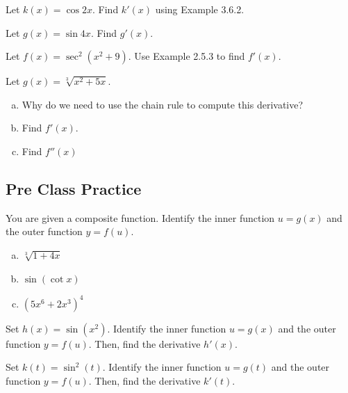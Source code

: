 \documentclass[notes]{subfiles}
\begin{document}
		\begin{ex}
			Let \(k(x) = \cos 2x\).  Find \(k'(x)\) using Example 3.6.2.
		\end{ex}
		
		\begin{ex}
			Let \(g(x) = \sin 4x\).  Find \(g'(x)\).
		\end{ex}
			\newpage
			
		\begin{ex}
			Let \(f(x) = \sec^2(x^2+9)\).  Use Example 2.5.3 to find \(f'(x)\).
		\end{ex}
			
		\begin{ex}
			Let \(g(x) = \sqrt[3]{x^2 + 5x}\).
			\begin{enumerate}[(a)]
				\item Why do we need to use the chain rule to compute this derivative?
					
				\item Find \(f'(x)\).
					
				\item Find \(f''(x)\)
			\end{enumerate}
		\end{ex}
			\newpage
			
	\subsection*{Pre Class Practice}		
		\begin{ex}
			You are given a composite function.  Identify the inner function $u = g(x)$ and the outer function $y = f(u)$.
			\begin{enumerate}[(a)]
				\item \( \sqrt[3]{1+4x}\)
					\vs{.5}
					
				\item \(\sin (\cot x)\)
					\vs{.5}
					
				\item \((5x^6 + 2x^3)^4\)
					\vs{.5}
			\end{enumerate}
		\end{ex}
		
		\begin{ex}
			Set \(h(x) = \sin (x^2)\).  Identify the inner function \(u = g(x)\) and the outer function \(y = f(u)\).  Then, find the derivative \(h'(x)\).
		\end{ex}
			\vs{1}
			
		\begin{ex}
			Set \(k(t) = \sin^2(t)\).  Identify the inner function \(u = g(t)\) and the outer function \(y = f(u)\).  Then, find the derivative \(k'(t)\).
		\end{ex}
			\vs{1}
			\newpage
			
\end{document}
